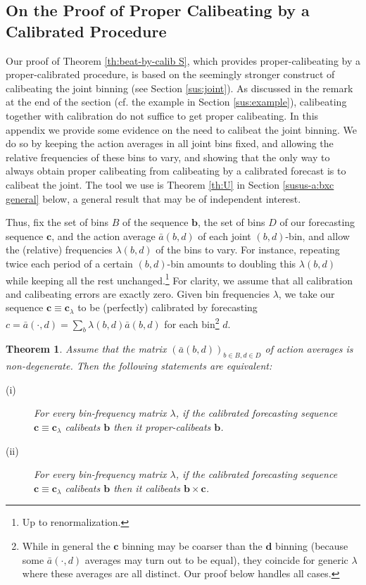 \documentclass[12pt,a4paper,notitlepage]{article}
\newtheorem{theorem}{Theorem}
\begin{document}
\subsection{On the Proof of Proper Calibeating by a Calibrated Procedure 
\label{sus-a:bxc}}

Our proof of Theorem \ref{th:beat-by-calib S}, which provides
proper-calibeating by a proper-calibrated procedure, is based on the
seemingly stronger construct of calibeating the joint binning (see Section %
\ref{sus:joint}). As discussed in the remark at the end of the section (cf.
the example in Section \ref{sus:example}), calibeating together with
calibration do not suffice to get proper calibeating. In this appendix we
provide some evidence on the need to calibeat the joint binning. We do so by
keeping the action averages in all joint bins fixed, and allowing the
relative frequencies of these bins to vary, and showing that the only way to
always obtain proper calibeating from calibeating by a calibrated forecast
is to calibeat the joint. The tool we use is Theorem \ref{th:U} in Section %
\ref{susus-a:bxc general} below, a general result that may be of independent
interest.

Thus, fix the set of bins $B$ of the sequence $\mathbf{b}$, the set of bins $%
D$ of our forecasting sequence $\mathbf{c}$, and the action average $\bar{a}%
(b,d)$ of each joint $(b,d)$-bin, and allow the (relative) frequencies $%
\lambda (b,d)$ of the bins to vary. For instance, repeating twice each
period of a certain $(b,d)$-bin amounts to doubling this $\lambda (b,d)$
while keeping all the rest unchanged.\footnote{%
Up to renormalization.} For clarity, we assume that all calibration and
calibeating errors are exactly zero. Given bin frequencies $\lambda $, we
take our sequence $\mathbf{c}\equiv \mathbf{c}_{\lambda }$ to be (perfectly)
calibrated by forecasting $c=\bar{a}(\cdot ,d)=\sum_{b}\lambda (b,d)\bar{a}%
(b,d)$ for each bin\footnote{%
While in general the $\mathbf{c}$ binning may be coarser than the $\mathbf{d}
$ binning (because some $\bar{a}(\cdot ,d)$ averages may turn out to be
equal), they coincide for generic $\lambda $ where these averages are all
distinct. Our proof below handles all cases.} $d$. 

\begin{theorem}
\label{th:bxc}Assume that the matrix $(\bar{a}(b,d))_{b\in B,d\in D}$ of
action averages is non-degenerate. Then the following statements are
equivalent:

\begin{description}
\item[(i)] For every bin-frequency matrix $\lambda $, if the calibrated
forecasting sequence $\mathbf{c}\equiv \mathbf{c}_{\lambda }$ calibeats $%
\mathbf{b}$ then it proper-calibeats $\mathbf{b}$.

\item[(ii)] For every bin-frequency matrix $\lambda $, if the calibrated
forecasting sequence $\mathbf{c}\equiv \mathbf{c}_{\lambda }$ calibeats $%
\mathbf{b}$ then it calibeats $\mathbf{b\times c}$.
\end{description}
\end{theorem}
\end{document}
